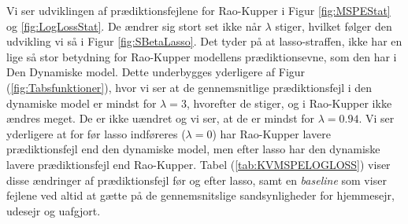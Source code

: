 \documentclass[11pt,a4paper]{article}
\begin{document}
 Vi ser udviklingen af prædiktionsfejlene for Rao-Kupper i Figur \ref{fig:MSPEStat} og \ref{fig:LogLossStat}. De ændrer sig stort set ikke når $\lambda$ stiger, hvilket følger den udvikling vi så i Figur \ref{fig:SBetaLasso}. Det tyder på at lasso-straffen, ikke har en lige så stor betydning for Rao-Kupper modellens prædiktionsevne, som den har i Den Dynamiske model. Dette underbygges yderligere af Figur (\ref{fig:Tabsfunktioner}), hvor vi ser at de gennemsnitlige prædiktionsfejl i den dynamiske model er mindst for $\lambda = 3$, hvorefter de stiger, og i Rao-Kupper ikke ændres meget. De er ikke uændret og vi ser, at de er mindst for $\lambda = 0.94$. Vi ser yderligere at for før lasso indføreres ($\lambda = 0$) har Rao-Kupper lavere prædiktionsfejl end den dynamiske model, men efter lasso har den dynamiske lavere prædiktionsfejl end Rao-Kupper. Tabel (\ref{tab:KVMSPELOGLOSS}) viser disse ændringer af prædiktionsfejl før og efter lasso, samt en \textit{baseline} som viser fejlene ved altid at gætte på de gennemsnitslige sandsynligheder for hjemmesejr, udesejr og uafgjort. \\
\end{document}
